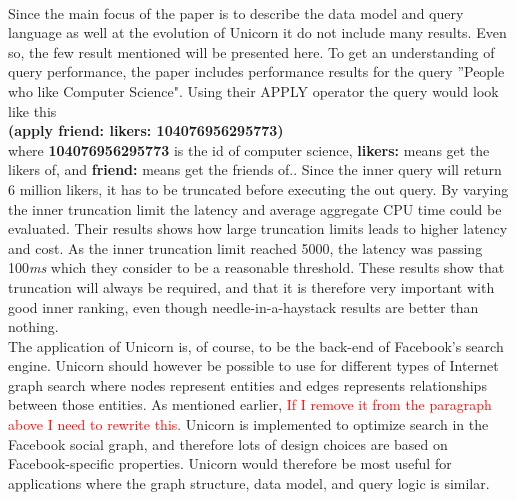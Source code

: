 \documentclass{article}
\begin{document}
\noindent \\ Since the main focus of the paper is to describe the data model and query language as well at the evolution of Unicorn it do not include many results. Even so, the few result mentioned will be presented here. To get an understanding of query performance, the paper includes performance results for the query ''People who like Computer Science". Using their APPLY operator the query would look like this\\

\noindent \textbf{(apply friend: likers: 104076956295773)}\\

where \textbf{104076956295773} is the id of computer science, \textbf{likers:} means get the likers of, and \textbf{friend:} means get the friends of.. Since the inner query will return 6 million likers, it has to be truncated before executing the out query. By varying the inner truncation limit the latency and average aggregate CPU time could be evaluated. Their results shows how large truncation limits leads to higher latency and cost. As the inner truncation limit reached 5000, the latency was passing 100\textit{ms} which they consider to be a reasonable threshold. These results show that truncation will always be required, and that it is therefore very important with good inner ranking, even though needle-in-a-haystack results are better than nothing. \\

\noindent The application of Unicorn is, of course, to be the back-end of Facebook's search engine. Unicorn should however be possible to use for different types of Internet graph search where nodes represent entities and edges represents relationships between those entities. As mentioned earlier, \textcolor{red}{If I remove it from the paragraph above I need to rewrite this.} Unicorn is implemented to optimize search in the Facebook social graph, and therefore lots of design choices are based on Facebook-specific properties. Unicorn would therefore be most useful for applications where the graph structure, data model, and query logic is similar. \\
\end{document}
